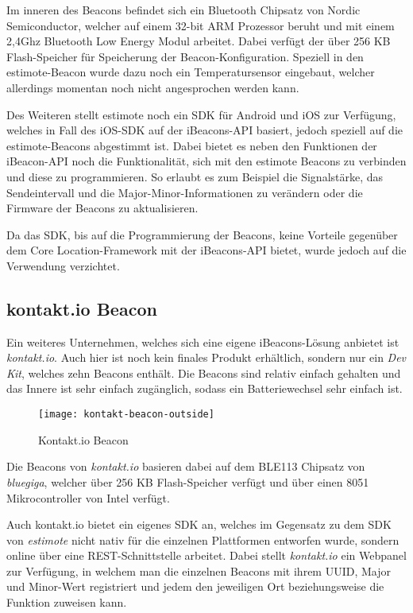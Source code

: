 Im inneren des Beacons befindet sich ein Bluetooth Chipsatz von Nordic Semiconductor, welcher auf einem 32-bit ARM Prozessor beruht und mit einem 2,4Ghz Bluetooth Low Energy Modul arbeitet. Dabei verfügt der über 256 KB Flash-Speicher für Speicherung der Beacon-Konfiguration.
Speziell in den estimote-Beacon wurde dazu noch ein Temperatursensor eingebaut, welcher allerdings momentan noch nicht angesprochen werden kann.

Des Weiteren stellt estimote noch ein SDK für Android und iOS zur Verfügung, welches in Fall des iOS-SDK auf der iBeacons-API basiert, jedoch speziell auf die estimote-Beacons abgestimmt ist. 
Dabei bietet es neben den Funktionen der iBeacon-API noch die Funktionalität, sich mit den estimote Beacons zu verbinden und diese zu programmieren. So erlaubt es zum Beispiel die Signalstärke, das Sendeintervall und die Major-Minor-Informationen zu verändern oder die Firmware der Beacons zu aktualisieren.

Da das SDK, bis auf die Programmierung der Beacons, keine Vorteile gegenüber dem Core Location-Framework mit der iBeacons-API bietet, wurde jedoch auf die Verwendung verzichtet.

\subsection{kontakt.io Beacon}
\label{sec:dataandmeasurement:mobilebeacon:kontaktio}
Ein weiteres Unternehmen, welches sich eine eigene iBeacons-Lösung anbietet ist \emph{kontakt.io}. Auch hier ist noch kein finales Produkt erhältlich, sondern nur ein \emph{Dev Kit}, welches zehn Beacons enthält. 
Die Beacons sind relativ einfach gehalten und das Innere ist sehr einfach zugänglich, sodass ein Batteriewechsel sehr einfach ist.


\begin{figure}[htb!]
		\centering
	\texttt{[image: kontakt-beacon-outside]}
	\caption{Kontakt.io Beacon}
	\label{kontakt-beacon-outside}
\end{figure}

Die Beacons von \emph{kontakt.io} basieren dabei auf dem BLE113 Chipsatz von \emph{bluegiga}, welcher über 256 KB Flash-Speicher verfügt und über einen 8051 Mikrocontroller von Intel verfügt.


Auch kontakt.io bietet ein eigenes SDK an, welches im Gegensatz zu dem SDK von \emph{estimote} nicht nativ für die einzelnen Plattformen entworfen wurde, sondern online über eine REST-Schnittstelle arbeitet.
Dabei stellt \emph{kontakt.io} ein Webpanel zur Verfügung, in welchem man die einzelnen Beacons mit ihrem UUID, Major und Minor-Wert registriert und jedem den jeweiligen Ort beziehungsweise die Funktion zuweisen kann. 


